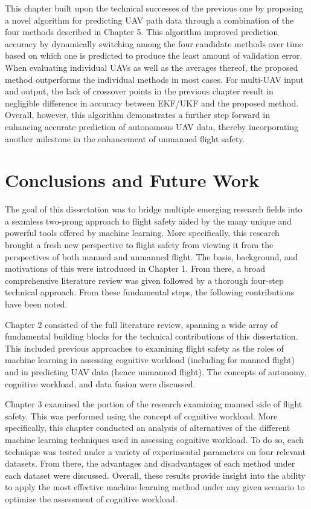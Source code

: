 \documentclass[12pt]{uthesis-v12}  %
\begin{document}
This chapter built upon the technical successes of the previous one by proposing a novel algorithm for predicting UAV path data through a combination of the four methods described in Chapter 5. This algorithm improved prediction accuracy by dynamically switching among the four candidate methods over time based on which one is predicted to produce the least amount of validation error. When evaluating individual UAVs as well as the averages thereof, the proposed method outperforms the individual methods in most cases. For multi-UAV input and output, the lack of crossover points in the previous chapter result in negligible difference in accuracy between EKF/UKF and the proposed method. Overall, however, this algorithm demonstrates a further step forward in enhancing accurate prediction of autonomous UAV data, thereby incorporating another milestone in the enhancement of unmanned flight safety.


\chapter{Conclusions and Future Work}

The goal of this dissertation was to bridge multiple emerging research fields into a seamless two-prong approach to flight safety aided by the many unique and powerful tools offered by machine learning. More specifically, this research brought a fresh new perspective to flight safety from viewing it from the perspectives of both manned and unmanned flight. The basis, background, and motivations of this were introduced in Chapter 1. From there, a broad comprehensive literature review was given followed by a thorough four-step technical approach. From these fundamental steps, the following contributions have been noted.

Chapter 2 consisted of the full literature review, spanning a wide array of fundamental building blocks for the technical contributions of this dissertation. This included previous approaches to examining flight safety as the roles of machine learning in assessing cognitive workload (including for manned flight) and in predicting UAV data (hence unmanned flight). The concepts of autonomy, cognitive workload, and data fusion were discussed.

Chapter 3 examined the portion of the research examining manned side of flight safety. This was performed using the concept of cognitive workload. More specifically, this chapter conducted an analysis of alternatives of the different machine learning techniques used in assessing cognitive workload. To do so, each technique was tested under a variety of experimental parameters on four relevant datasets. From there, the advantages and disadvantages of each method under each dataset were discussed. Overall, these results provide insight into the ability to apply the most effective machine learning method under any given scenario to optimize the assessment of cognitive workload.
\end{document}
